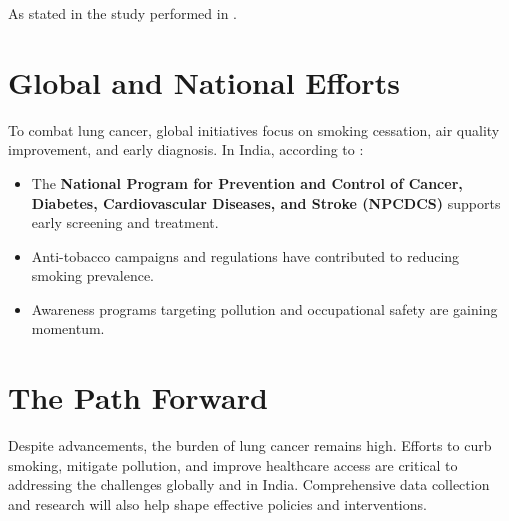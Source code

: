As stated in the study performed in \cite{akhtar2017risk}.

\section{Global and National Efforts}
To combat lung cancer, global initiatives focus on smoking cessation, air quality improvement, and early diagnosis. In India, according to \cite{leiter2023global}:
\begin{itemize}
    \item The \textbf{National Program for Prevention and Control of Cancer, Diabetes, Cardiovascular Diseases, and Stroke (NPCDCS)} supports early screening and treatment.
    \item Anti-tobacco campaigns and regulations have contributed to reducing smoking prevalence.
    \item Awareness programs targeting pollution and occupational safety are gaining momentum.
\end{itemize}

\section{The Path Forward}
Despite advancements, the burden of lung cancer remains high. Efforts to curb smoking, mitigate pollution, and improve healthcare access are critical to addressing the challenges globally and in India. Comprehensive data collection and research will also help shape effective policies and interventions.